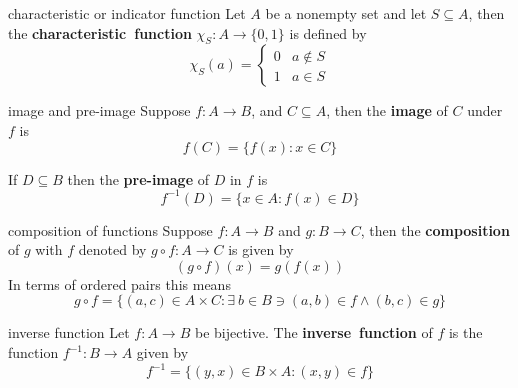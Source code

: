 \documentclass[avery5371,grid]{flashcards}
\begin{document}
\begin{flashcard}[Definition]{characteristic or indicator function}
Let $A$ be a nonempty set and let $S \subseteq A$, then the
\mbox{\textbf{characteristic function}} $\chi_{S} : A \rightarrow \{ 0,1 \}$
is defined by
\begin{equation*}
\chi_{S}(a) = \left\{ \begin{array}{ll}
  0 & a \notin S \\
  1 & a \in S
\end{array} \right.
\end{equation*} 
\end{flashcard}

\begin{flashcard}[Definition]{image and pre-image}
Suppose $f: A\rightarrow B$, and $C\subseteq A$, then the \textbf{image}
of $C$ under $f$ is
\begin{equation*}
f(C)=\{ f(x): x\in C\}
\end{equation*}

\bigskip
If $D\subseteq B$ then the \textbf{pre-image} of $D$ in $f$ is
\begin{equation*}
f^{-1}(D) = \{ x\in A : f(x) \in D\}
\end{equation*}
\end{flashcard}

\begin{flashcard}[Definition]{composition of functions}
Suppose $f: A \rightarrow B$ and $g: B \rightarrow C$, then the
\mbox{\textbf{composition}} of $g$ with $f$ denoted by
$g\circ f: A \rightarrow C$ is given by
\begin{equation*}
(g\circ f)(x) = g(f(x))
\end{equation*}
In terms of ordered pairs this means
\begin{equation*}
g\circ f =
\{(a,c) \in A \times C :
\exists \ b \in B \ni (a,b) \in f \wedge (b,c) \in g \}
\end{equation*}
\end{flashcard}

\begin{flashcard}[Definition]{inverse function}
Let $f: A\rightarrow B$ be bijective.  The
\mbox{\textbf{inverse function}} of $f$ is the function $f^{-1}:B
\rightarrow A$ given by
\begin{equation*}
f^{-1} = \{(y,x) \in B \times A : (x,y) \in f \}
\end{equation*}
\end{flashcard}
\end{document}
